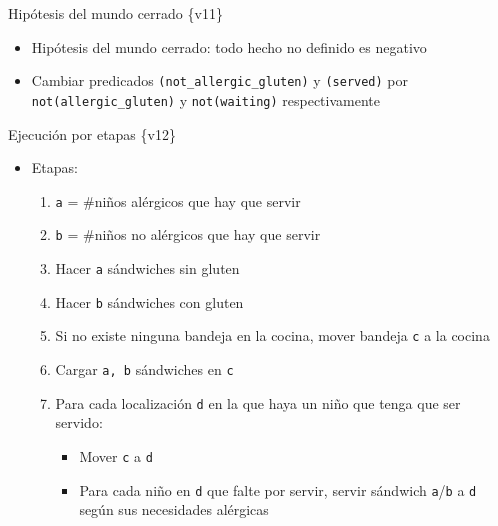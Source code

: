 \documentclass[xcolor=table]{beamer}
\begin{document}

\begin{frame}{Hipótesis del mundo cerrado \{v11\}}
    \begin{itemize}
        \item Hipótesis del mundo cerrado: todo hecho no definido es negativo
        \item Cambiar predicados \texttt{(not\_allergic\_gluten)} y \texttt{(served)} por \texttt{not(allergic\_gluten)} y \texttt{not(waiting)} respectivamente
        
    \end{itemize}
    
\end{frame}


\begin{frame}{Ejecución por etapas \{v12\}}
    \begin{itemize}
        \item Etapas:
        \begin{enumerate}
            \item \texttt{a} = #niños alérgicos que hay que servir
            \item \texttt{b} = #niños no alérgicos que hay que servir
            \item Hacer \texttt{a} sándwiches sin gluten
            \item Hacer \texttt{b} sándwiches con gluten
            \item Si no existe ninguna bandeja en la cocina, mover bandeja \texttt{c} a la cocina
            \item Cargar \texttt{a, b} sándwiches en \texttt{c}
            \item Para cada localización \texttt{d} en la que haya un niño que tenga que ser servido:
            \begin{itemize}
                \item Mover \texttt{c} a \texttt{d}
                \item Para cada niño en \texttt{d} que falte por servir, servir sándwich \texttt{a}/\texttt{b} a \texttt{d} según sus necesidades alérgicas
            \end{itemize}
        \end{enumerate}
    \end{itemize}
\end{frame}
\end{document}
